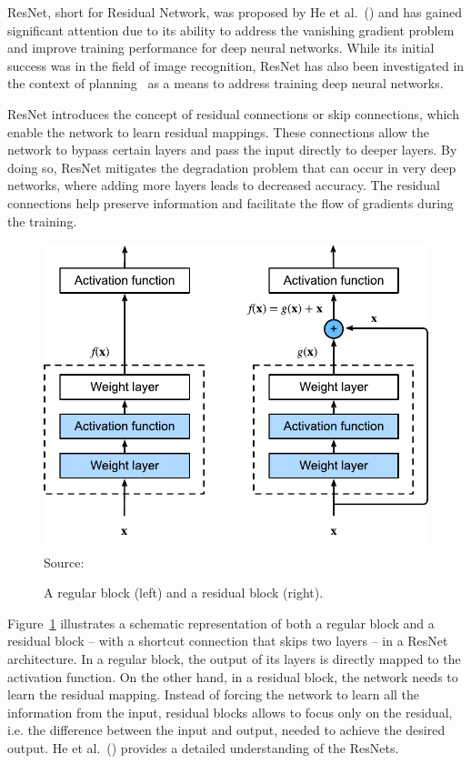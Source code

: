 ResNet, short for Residual Network, was proposed by He et al.~(\citeyear{He.etal/2016}) and has gained significant attention due to its ability to address the vanishing gradient problem~\cite{Hochreiter/1998} and improve training performance for deep neural networks. While its initial success was in the field of image recognition, ResNet has also been investigated in the context of planning~\cite{Agostinelli.etal/2019,Ferber.etal/2022} as a means to address training deep neural networks.

ResNet introduces the concept of residual connections or skip connections, which enable the network to learn residual mappings. These connections allow the network to bypass certain layers and pass the input directly to deeper layers. By doing so, ResNet mitigates the degradation problem that can occur in very deep networks, where adding more layers leads to decreased accuracy. The residual connections help preserve information and facilitate the flow of gradients during the training.

\begin{figure}[t]
    \caption[A regular block and a residual block.]{A regular block (left) and a residual block (right).}
    \label{fig:residual_block}
    \addvspace{\baselineskip}
    \centering
    \includegraphics[width=0.75\linewidth]{figures/residual_block.pdf} \\
    Source:~\cite{Zhang.etal/2021}
\end{figure}

Figure~\ref{fig:residual_block} illustrates a schematic representation of both a regular block and a residual block -- with a shortcut connection that skips two layers -- in a ResNet architecture. In a regular block, the output of its layers is directly mapped to the activation function. On the other hand, in a residual block, the network needs to learn the residual mapping. Instead of forcing the network to learn all the information from the input, residual blocks allows to focus only on the residual, i.e. the difference between the input and output, needed to achieve the desired output. He et al.~(\citeyear{He.etal/2016}) provides a detailed understanding of the ResNets.

